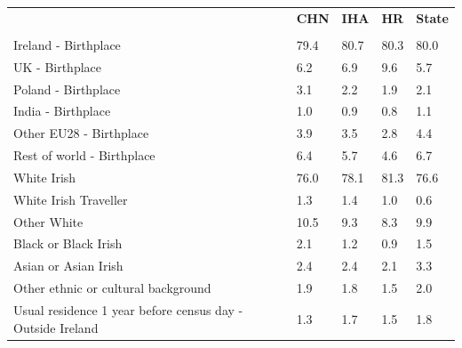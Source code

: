 \documentclass{article}
\begin{document}
\pagebreak
\begin{table}[h]	
\centering
		\begin{tabular}{KTTTT}
  \hline
& \textbf{CHN} & \textbf{IHA} & \textbf{HR}& \textbf{State}\\ 
  \hline
    \\ 
    \hline
Ireland - Birthplace & 79.4& 80.7& 80.3& 80.0\\
UK - Birthplace & 6.2& 6.9& 9.6& 5.7\\
Poland - Birthplace & 3.1& 2.2& 1.9& 2.1\\
India - Birthplace & 1.0& 0.9& 0.8& 1.1\\
Other EU28 - Birthplace & 3.9& 3.5& 2.8& 4.4\\
Rest of world - Birthplace & 6.4& 5.7& 4.6& 6.7\\
    \hline
White Irish & 76.0& 78.1& 81.3& 76.6\\
White Irish Traveller & 1.3& 1.4& 1.0& 0.6\\
Other White & 10.5&  9.3&  8.3&  9.9\\
Black or Black Irish & 2.1& 1.2& 0.9& 1.5\\
Asian or Asian Irish & 2.4& 2.4& 2.1& 3.3\\
Other ethnic or cultural background & 1.9& 1.8& 1.5& 2.0\\
    \hline
Usual residence 1 year before census day - Outside Ireland & 1.3& 1.7& 1.5& 1.8\\


\end{tabular}
\end{table}
\end{document}
